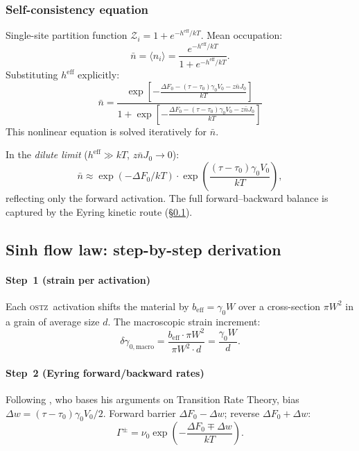 \documentclass[3p]{elsarticle}
\newcommand{\OSTZ}{\textsc{ostz}}
\newcommand{\dF}{\Delta F_0}
\newcommand{\gz}{\gamma_0}
\newcommand{\beff}{b_\mathrm{eff}}
\begin{document}
\subsubsection{Self-consistency equation}
\label{sec:selfconsistency}

Single-site partition function $\mathcal Z_i=1+e^{-h^\text{eff}/kT}$.
Mean occupation:
\begin{equation}
  \bar n=\langle n_i\rangle
  =\frac{e^{-h^\text{eff}/kT}}{1+e^{-h^\text{eff}/kT}}.
  \label{eq:selfconsistency}
\end{equation}
Substituting $h^\text{eff}$ explicitly:
\begin{equation}
  \boxed{\bar n=\frac{\exp\!\left[-\tfrac{\dF-(\tau-\tau_0)\gz V_0
    -z\bar nJ_0}{kT}\right]}{1+\exp\!\left[-\tfrac{\dF-(\tau-\tau_0)
    \gz V_0-z\bar nJ_0}{kT}\right]}}
  \label{eq:selfconsfull}
\end{equation}
This nonlinear equation is solved iteratively for $\bar n$.

In the \emph{dilute limit} ($h^\text{eff}\gg kT$, $z\bar nJ_0\to0$):
\[
  \bar n\approx\exp(-\dF/kT)\cdot\exp\!\left(\frac{(\tau-\tau_0)\gz V_0}{kT}\right),
\]
reflecting only the forward activation. The full forward--backward balance
is captured by the Eyring kinetic route (\S\ref{sec:sinh}).

\subsection{Sinh flow law: step-by-step derivation}
\label{sec:sinh}

\paragraph{Step~1 (strain per activation)}
Each \OSTZ\ activation shifts the material by $\beff=\gz W$ over a
cross-section $\pi W^2$ in a grain of average size $d$. The macroscopic
strain increment:
\begin{equation}
  \delta\gamma_{0,\text{macro}}=\frac{\beff\cdot\pi W^2}{\pi W^2\cdot d}
  =\frac{\gz W}{d}.
  \label{eq:deltaGamma}
\end{equation}

\paragraph{Step~2 (Eyring forward/backward rates)}
Following \citet{eyring1935}, who bases his arguments on
Transition Rate Theory, bias $\Delta w=(\tau-\tau_0)\gz V_0/2$.
Forward barrier $\dF-\Delta w$; reverse $\dF+\Delta w$:
\begin{equation}
  \Gamma^\pm=\nu_0\exp\!\left(-\frac{\dF\mp\Delta w}{kT}\right).
  \label{eq:Gamma}
\end{equation}
\end{document}
